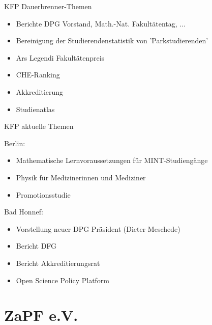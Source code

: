 \documentclass[compress, aspectratio=169]{beamer}
\begin{document}
 
 \begin{frame}{KFP Dauerbrenner-Themen}
  \begin{itemize}
   \item Berichte DPG Vorstand, Math.-Nat. Fakultätentag, ... 
   \item Bereinigung der Studierendenstatistik von 'Parkstudierenden'
   \item Ars Legendi Fakultätenpreis
   \item CHE-Ranking
   \item Akkreditierung
   \item Studienatlas
  \end{itemize}
 \end{frame}
 
 
 \begin{frame}{KFP aktuelle Themen}
 
  Berlin:
  \begin{itemize}
   \item Mathematische Lernvoraussetzungen für MINT-Studiengänge
   \item Physik für Medizinerinnen und Mediziner
   \item Promotionsstudie
  \end{itemize}
  
  \bigskip
  
  Bad Honnef:
  \begin{itemize}
   \item Vorstellung neuer DPG Präsident (Dieter Meschede)
   \item Bericht DFG 
   \item Bericht Akkreditierungsrat 
   \item Open Science Policy Platform 
  \end{itemize}
 \end{frame}

\section{ZaPF e.V.}
\end{document}
